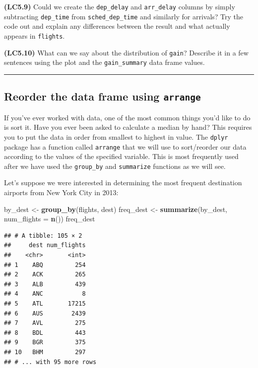 \documentclass[]{tufte-book}
\newenvironment{Shaded}{\begin{snugshade}}{\end{snugshade}}
\newcommand{\KeywordTok}[1]{\textcolor[rgb]{0.13,0.29,0.53}{\textbf{{#1}}}}
\newcommand{\DataTypeTok}[1]{\textcolor[rgb]{0.13,0.29,0.53}{{#1}}}
\newcommand{\StringTok}[1]{\textcolor[rgb]{0.31,0.60,0.02}{{#1}}}
\newcommand{\NormalTok}[1]{{#1}}
\let\oldrule=\rule
\renewcommand{\rule}[1]{\oldrule{\linewidth}}
\begin{document}
\textbf{(LC5.9)} Could we create the \texttt{dep\_delay} and
\texttt{arr\_delay} columns by simply subtracting \texttt{dep\_time}
from \texttt{sched\_dep\_time} and similarly for arrivals? Try the code
out and explain any differences between the result and what actually
appears in \texttt{flights}.

\textbf{(LC5.10)} What can we say about the distribution of
\texttt{gain}? Describe it in a few sentences using the plot and the
\texttt{gain\_summary} data frame values.

\begin{center}\rule{0.5\linewidth}{\linethickness}\end{center}

\subsection{\texorpdfstring{Reorder the data frame using
\texttt{arrange}}{Reorder the data frame using arrange}}\label{reorder-the-data-frame-using-arrange}

If you've ever worked with data, one of the most common things you'd
like to do is sort it. Have you ever been asked to calculate a median by
hand? This requires you to put the data in order from smallest to
highest in value. The \texttt{dplyr} package has a function called
\texttt{arrange} that we will use to sort/reorder our data according to
the values of the specified variable. This is most frequently used after
we have used the \texttt{group\_by} and \texttt{summarize} functions as
we will see.

Let's suppose we were interested in determining the most frequent
destination airports from New York City in 2013:

\begin{Shaded}
\begin{Highlighting}[]
\NormalTok{by_dest <-}\StringTok{ }\KeywordTok{group_by}\NormalTok{(flights, dest)}
\NormalTok{freq_dest <-}\StringTok{ }\KeywordTok{summarize}\NormalTok{(by_dest, }\DataTypeTok{num_flights =} \KeywordTok{n}\NormalTok{())}
\NormalTok{freq_dest}
\end{Highlighting}
\end{Shaded}

\begin{verbatim}
## # A tibble: 105 × 2
##     dest num_flights
##    <chr>       <int>
## 1    ABQ         254
## 2    ACK         265
## 3    ALB         439
## 4    ANC           8
## 5    ATL       17215
## 6    AUS        2439
## 7    AVL         275
## 8    BDL         443
## 9    BGR         375
## 10   BHM         297
## # ... with 95 more rows
\end{verbatim}
\end{document}
